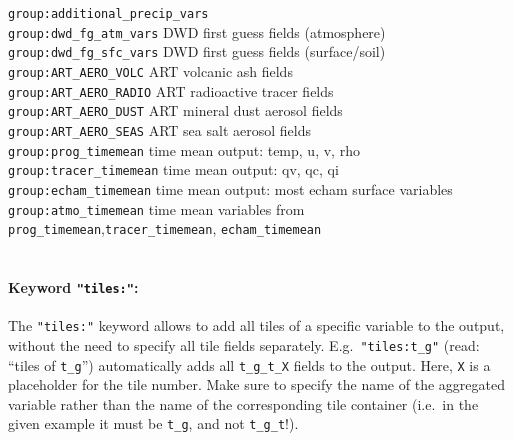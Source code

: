\begin{tabbing}
\texttt{group:additional\_precip\_vars}\>                                                                           \\
\texttt{group:dwd\_fg\_atm\_vars}      \>     DWD first guess fields (atmosphere)                                   \\
\texttt{group:dwd\_fg\_sfc\_vars}      \>     DWD first guess fields (surface/soil)                                 \\
\texttt{group:ART\_AERO\_VOLC}         \>     ART volcanic ash fields                                               \\
\texttt{group:ART\_AERO\_RADIO}        \>     ART radioactive tracer fields                                         \\
\texttt{group:ART\_AERO\_DUST}         \>     ART mineral dust aerosol fields                                       \\
\texttt{group:ART\_AERO\_SEAS}         \>     ART sea salt aerosol fields                                           \\
\texttt{group:prog\_timemean}          \>     time mean output: temp, u, v, rho                                     \\
\texttt{group:tracer\_timemean}        \>     time mean output: qv, qc, qi                                          \\
\texttt{group:echam\_timemean}         \>     time mean output: most echam surface variables                        \\
\texttt{group:atmo\_timemean}          \>     time mean variables from \texttt{prog\_timemean},\texttt{tracer\_timemean}, \texttt{echam\_timemean}\\                                                  \\
\end{tabbing}

\paragraph{Keyword \texttt{"tiles:"}:}
The \texttt{"tiles:"} keyword allows to add all tiles of a specific variable to the output, without the need to specify all 
tile fields separately. E.g.\ \texttt{"tiles:t\_g"} (read: ``tiles of \texttt{t\_g}'') automatically adds all \texttt{t\_g\_t\_X} 
fields to the output. Here, \texttt{X} is a placeholder for the tile number. Make sure to specify the name of the aggregated 
variable rather than the name of the corresponding tile container (i.e.\ in the given example it must be \texttt{t\_g}, and not 
\texttt{t\_g\_t}!).


